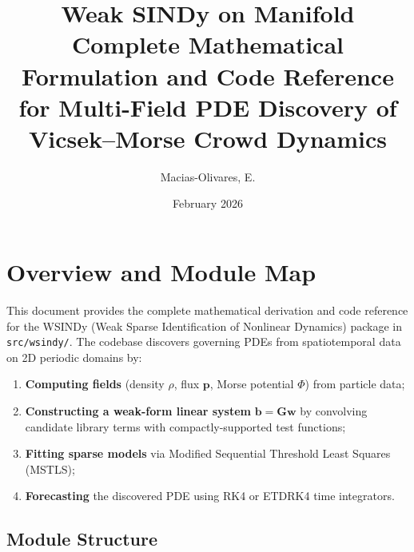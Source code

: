 \documentclass[11pt]{article}
\title{%
  \textbf{Weak SINDy on Manifold}\\[6pt]
  \large Complete Mathematical Formulation and Code Reference\\
  \large for Multi-Field PDE Discovery of Vicsek--Morse Crowd Dynamics}
\author{Macias-Olivares, E.}
\date{February 2026}
\newcommand{\bp}{\mathbf{p}}
\begin{document}
\maketitle
\tableofcontents
\newpage

\section{Overview and Module Map}

This document provides the complete mathematical derivation and code reference
for the WSINDy (Weak Sparse Identification of Nonlinear Dynamics) package
in \texttt{src/wsindy/}. The codebase discovers governing PDEs from
spatiotemporal data on 2D periodic domains by:

\begin{enumerate}[leftmargin=*]
\item \textbf{Computing fields} (density $\rho$, flux $\bp$, Morse potential $\Phi$) from particle data;
\item \textbf{Constructing a weak-form linear system} $\mathbf{b} = \mathbf{G}\mathbf{w}$
  by convolving candidate library terms with compactly-supported test functions;
\item \textbf{Fitting sparse models} via Modified Sequential Threshold Least Squares (MSTLS);
\item \textbf{Forecasting} the discovered PDE using RK4 or ETDRK4 time integrators.
\end{enumerate}

\subsection{Module Structure}
\end{document}
